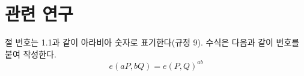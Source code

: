 
\section{관련 연구}
절 번호는 1.1과 같이 아라비아 숫자로 표기한다(규정 9). 수식은 다음과 같이
번호를 붙여 작성한다.
\begin{equation}
  e(aP, bQ) = e(P, Q)^{ab}
\end{equation}